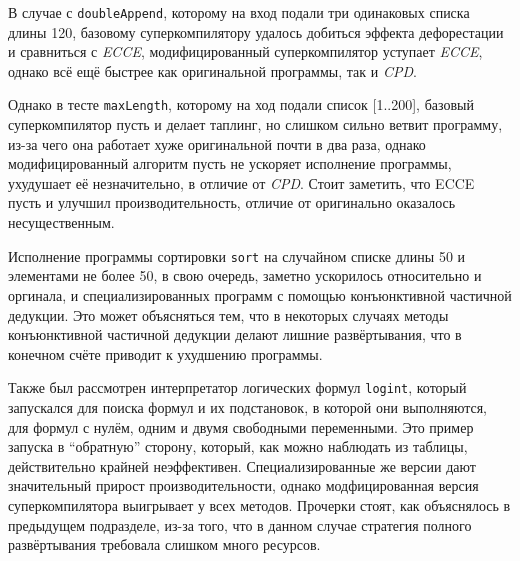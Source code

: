 В случае с \lstinline{doubleAppend}, которому на вход подали три одинаковых списка длины 120,
базовому суперкомпилятору удалось
добиться эффекта дефорестации и сравниться с {\it ECCE}, модифицированный суперкомпилятор
уступает {\it ECCE}, однако всё ещё быстрее как оригинальной программы, так и {\it CPD}.

Однако в тесте \lstinline{maxLength}, которому на ход подали список [1..200], базовый суперкомпилятор пусть и делает
таплинг, но слишком сильно ветвит программу, из-за чего она работает хуже оригинальной
почти в два раза, однако модифицированный алгоритм пусть не ускоряет исполнение программы,
ухудушает её незначительно, в отличие от {\it CPD}. Стоит заметить, что ECCE пусть и
улучшил производительность, отличие от оригинально оказалось несущественным.

Исполнение программы сортировки \lstinline{sort} на случайном списке длины 50 и элементами
не более 50, в свою очередь, заметно ускорилось относительно и оргинала, и специализированных
программ с помощью конъюнктивной частичной дедукции. Это может объясняться тем, что в некоторых
случаях методы конъюнктивной частичной дедукции делают лишние развёртывания, что в конечном
счёте приводит к ухудшению программы.

Также был рассмотрен интерпретатор логических формул \lstinline{logint}, который
запускался для поиска формул и их подстановок, в которой они выполняются, для
формул с нулём, одним и двумя свободными переменными. Это пример запуска в ``обратную''
сторону, который, как можно наблюдать из таблицы, действительно крайней неэффективен.
Специализированные же версии дают значительный прирост производительности, однако
модфицированная версия суперкомпилятора выигрывает у всех методов. Прочерки стоят,
как объяснялось в предыдущем подразделе, из-за того, что в данном случае стратегия
полного развёртывания требовала слишком много ресурсов.
